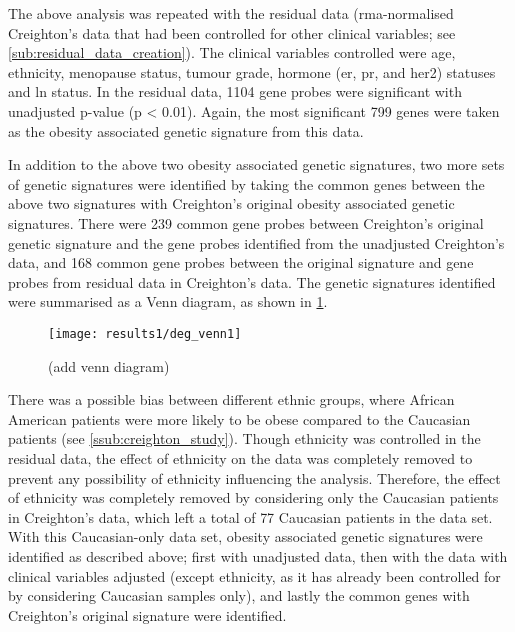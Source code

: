 The above analysis was repeated with the residual data (\gls{rma}-normalised Creighton's data that had been controlled for other clinical variables; see \cref{sub:residual_data_creation}).
The clinical variables controlled were age, ethnicity, menopause status, tumour grade, hormone (\gls{er}, \gls{pr}, and \gls{her2}) statuses  and \gls{ln} status.
In the residual data, 1104 gene probes were significant with unadjusted p-value (p \textless{} 0.01).
Again, the most significant 799 genes were taken as the obesity associated genetic signature from this data.

In addition to the above two obesity associated genetic signatures, two more sets of genetic signatures were identified by taking the common genes between the above two signatures with Creighton's original obesity associated genetic signatures.
There were 239 common gene probes between Creighton's original genetic signature and the gene probes identified from the unadjusted Creighton's data, and 168 common gene probes between the original signature and gene probes from residual data in Creighton's data.
The genetic signatures identified were summarised as a Venn diagram, as shown in \cref{fig:venn1}.
\\

\begin{figure}[htp!]
	\centering
	\texttt{[image: results1/deg\_venn1]}
	\caption[Summary of the \glspl{deg} identified from Creighton's data]{(add venn diagram)}
	\label{fig:venn1}
\end{figure}

\noindent
There was a possible bias between different ethnic groups, where African American patients were more likely to be obese compared to the Caucasian patients (see \cref{ssub:creighton_study}).
Though ethnicity was controlled in the residual data, the effect of ethnicity on the data was completely removed to prevent any possibility of ethnicity influencing the analysis.
Therefore, the effect of ethnicity was completely removed by considering only the Caucasian patients in Creighton's data, which left a total of 77 Caucasian patients in the data set.
With this Caucasian-only data set, obesity associated genetic signatures were identified as described above; first with unadjusted data, then with the data with clinical variables adjusted (except ethnicity, as it has already been controlled for by considering Caucasian samples only), and lastly the common genes with Creighton's original signature were identified.

